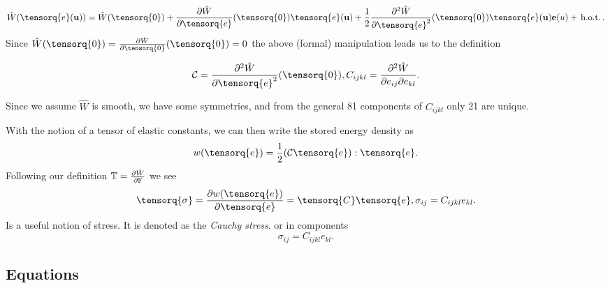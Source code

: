 \documentclass[reqno, a4paper]{article}
\begin{document}
\[
	\hat{W}\qty(\tensorq{e}\qty(\vb{u}))= \hat{W}\qty(\tensorq{0})+ \pdv{\hat{W}}{\tensorq{e}}\qty(\tensorq{0})\tensorq{e}\qty(\vb{u})+\frac{1}{2}\pdv[2]{\hat{W}}{\tensorq{e}}\qty(\tensorq{0})\tensorq{e}\qty(\vb{u}) \vb{e}\qty(u) + \, \text{h.o.t.} \,.
\]
Since $\hat{W}\qty(\tensorq{0}) = \pdv{\hat{W}}{\tensorq{0}}\qty(\tensorq{0}) = 0$ the above (formal) manipulation leads us to the definition
\begin{definition}
	\[
	\mathcal{C} = \pdv[2]{\hat{W}}{\tensorq{e}}\qty(\tensorq{0}), C_{ijkl} = \pdv[2]{\hat{W}}{e_{ij}}{e_{kl}}.
	\]
\end{definition}
\begin{remark}
    Since we assume $\hat{W}$ is smooth, we have some symmetries, and from the general 81 components of $C_{ijkl}$ only 21 are unique.
\end{remark}

With the notion of a tensor of elastic constants, we can then write the stored energy density as
\[
	w\qty(\tensorq{e}) = \frac{1}{2}(\mathcal{C}\tensorq{e}):\tensorq{e}.
\]
Following our definition $\mathbb{T} = \pdv{\hat{W}}{\ensuremath{\mathbb{F}}}$ we see
\[
	\tensorq{\sigma} = \pdv{w\qty(\tensorq{e})}{\tensorq{e}} = \tensorq{C}\tensorq{e}, \sigma_{ij} = C_{ijkl}e_{kl}.
\]
Is a useful notion of stress. It is denoted as the \textit{Cauchy stress}.
or in components
\[
	\sigma_{ij}=C_{ijkl}e_{kl}.
\]

\subsection{Equations}
\label{sec:linel_equations}
\end{document}
